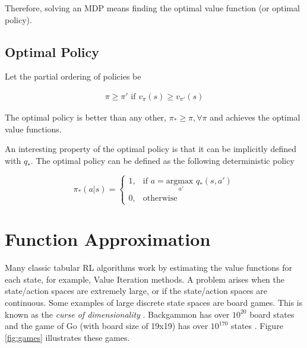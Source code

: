 Therefore, solving an MDP means finding the optimal value function (or optimal policy).

\subsection{Optimal Policy}

Let the partial ordering of policies be

\begin{align*}
    \pi \geq \pi\prime \text{ if } v_\pi(s) \geq v_{\pi\prime}(s)
\end{align*}

The optimal policy is better than any other,  $\pi_* \geq \pi, \forall \pi$ and achieves the optimal value functions.

An interesting property of the optimal policy is that it can be implicitly defined with $q_*$.
The optimal policy can be defined as the following deterministic policy

\[
    \pi_*(a | s) = 
\begin{cases}
    1,& \text{if } a = \underset{a'}{\textrm{argmax }} q_*(s,a')\\
    0,& \text{otherwise}
\end{cases}
\]

\section{Function Approximation}

Many classic tabular RL algorithms work by estimating the value functions for each state, for example, Value Iteration methods.
A problem arises when the state/action spaces are extremely large, or if the state/action spaces are continuous.
Some examples of large discrete state spaces are board games. This is known as the \textit{curse of dimensionality} \cite{CurseOfDimensionality}.
Backgammon has over $10^{20}$ board states \cite{Backgammon} and the game of Go (with board size of 19x19) has over $10^{170}$ states \cite{GoGame}. 
Figure \ref{fig:games} illustrates these games.

